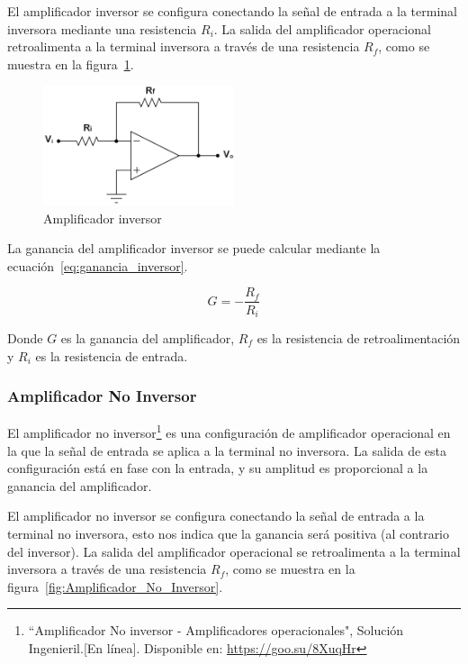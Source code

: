            El amplificador inversor se configura conectando la señal de entrada a la terminal inversora mediante una resistencia $R_i$. La salida del amplificador operacional retroalimenta a la terminal inversora a través de una resistencia $R_f$, como se muestra en la figura~\ref{fig:Amplificador_Inversor}.
            
            \begin{figure}[H]
                \centering
                \includegraphics[width=0.5\textwidth]{img/Marco/Amplificador_Inversor.png}
                \caption[Amplificador inversor]{Amplificador inversor\footnotemark}
                \label{fig:Amplificador_Inversor}
            \end{figure}

            La ganancia del amplificador inversor se puede calcular mediante la ecuación~\ref{eq:ganancia_inversor}.

            \begin{equation}
                \label{eq:ganancia_inversor}
                G = -\frac{R_f}{R_i}
            \end{equation}

            Donde $G$ es la ganancia del amplificador, $R_f$ es la resistencia de retroalimentación y $R_i$ es la resistencia de entrada.

        \subsubsection{Amplificador No Inversor}
            El amplificador no inversor\footnote{``Amplificador No inversor - Amplificadores operacionales", Solución Ingenieril.[En línea]. Disponible en: \url{https://goo.su/8XuqHr}} es una configuración de amplificador operacional en la que la señal de entrada se aplica a la terminal no inversora. La salida de esta configuración está en fase con la entrada, y su amplitud es proporcional a la ganancia del amplificador.

            El amplificador no inversor se configura conectando la señal de entrada a la terminal no inversora, esto nos indica que la ganancia será positiva (al contrario del inversor). La salida del amplificador operacional se retroalimenta a la terminal inversora a través de una resistencia $R_f$, como se muestra en la figura~\ref{fig:Amplificador_No_Inversor}.

